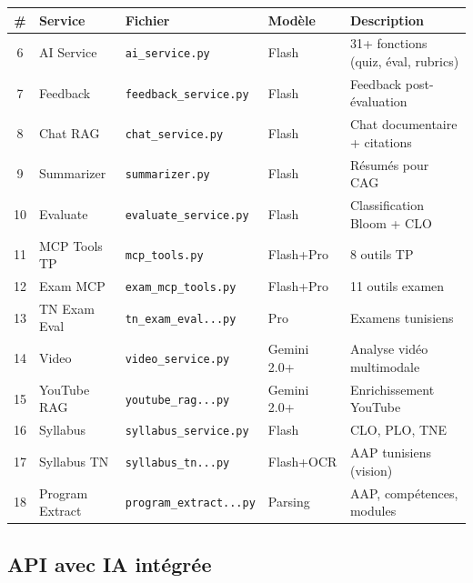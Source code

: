 \documentclass[12pt,a4paper]{article}
\begin{document}
\begin{longtable}{@{}clp{3cm}p{2cm}p{5cm}@{}}
\toprule
\textbf{\#} & \textbf{Service} & \textbf{Fichier} & \textbf{Modèle} & \textbf{Description} \\
\midrule
\endhead
6 & AI Service & \texttt{ai\_service.py} & Flash & 31+ fonctions (quiz, éval, rubrics) \\
7 & Feedback & \texttt{feedback\_service.py} & Flash & Feedback post-évaluation \\
8 & Chat RAG & \texttt{chat\_service.py} & Flash & Chat documentaire + citations \\
9 & Summarizer & \texttt{summarizer.py} & Flash & Résumés pour CAG \\
10 & Evaluate & \texttt{evaluate\_service.py} & Flash & Classification Bloom + CLO \\
11 & MCP Tools TP & \texttt{mcp\_tools.py} & Flash+Pro & 8 outils TP \\
12 & Exam MCP & \texttt{exam\_mcp\_tools.py} & Flash+Pro & 11 outils examen \\
13 & TN Exam Eval & \texttt{tn\_exam\_eval...py} & Pro & Examens tunisiens \\
14 & Video & \texttt{video\_service.py} & Gemini 2.0+ & Analyse vidéo multimodale \\
15 & YouTube RAG & \texttt{youtube\_rag...py} & Gemini 2.0+ & Enrichissement YouTube \\
16 & Syllabus & \texttt{syllabus\_service.py} & Flash & CLO, PLO, TNE \\
17 & Syllabus TN & \texttt{syllabus\_tn...py} & Flash+OCR & AAP tunisiens (vision) \\
18 & Program Extract & \texttt{program\_extract...py} & Parsing & AAP, compétences, modules \\
\bottomrule
\end{longtable}

\subsection{API avec IA intégrée}
\end{document}
